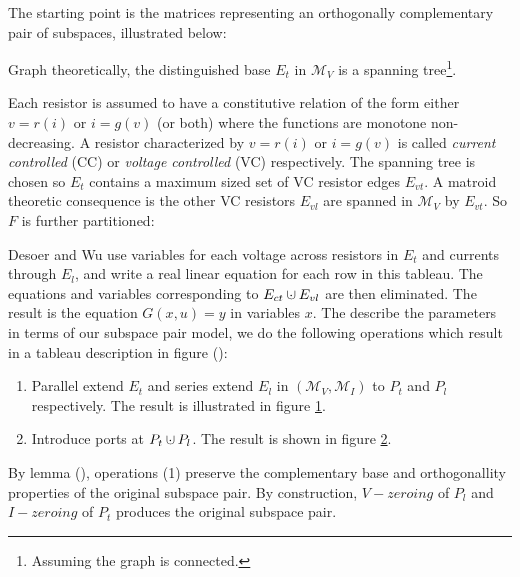 \documentclass{amsproc-sunycstr}
\theoremstyle{plain}
\theoremstyle{definition}
\theoremstyle{remark}
\newcommand{\dunion}
{\mbox{\hbox{\hskip4pt$\cdot$\hskip-4.62pt$\cup$\hskip2pt}}}
\begin{document}
The starting point is the matrices representing an orthogonally complementary
pair of subspaces, illustrated below:
\begin{center}

\end{center}
Graph theoretically, the distinguished base $E_t$ in 
$\mathcal{M}_V$ is a spanning tree\footnote{Assuming the graph is connected.}.

Each resistor is assumed to have a constitutive relation of the form either
$v=r(i)$ or $i=g(v)$ (or both) where the functions are monotone non-decreasing.
A resistor characterized by
$v=r(i)$ or $i=g(v)$ is called \textit{current controlled} (CC) or
\textit{voltage controlled} (VC) respectively.  The spanning tree is chosen so
$E_t$ contains a maximum sized set of VC resistor edges $E_{vt}$.  A matroid
theoretic consequence is the other VC resistors $E_{vl}$ are spanned in 
$\mathcal{M}_V$ by $E_{vt}$.  So $F$ is further partitioned:

Desoer and Wu use variables for each voltage across resistors in $E_t$ and
currents through $E_l$, and write a real linear equation for each row in this
tableau.   The equations and variables corresponding to $E_{ct}\dunion E_{vl}$
are then eliminated.  The result is the equation $G(x,u)=y$ in variables
$x$.  The describe the parameters in terms of our subspace pair model, we 
do the following operations which result in a tableau description in figure
():
\begin{enumerate}
\item Parallel extend $E_t$ and series extend $E_l$ in 
$(\mathcal{M}_V,\mathcal{M}_I)$ to $P_t$ and $P_l$ respectively.  The result is 
illustrated in figure \ref{DEdualmatrices2}.
\item Introduce ports at $P_t\dunion P_l$.  The result is shown in figure 
\ref{DEsubspacepair}.
\end{enumerate}

\begin{figure}
\label{DEdualmatrices2}

\end{figure}

\begin{figure}
\label{DEsubspacepair}

\end{figure}


By lemma (), operations (1) preserve the complementary base and 
orthogonallity properties of the original subspace pair.  By construction,
$V-zeroing$ of $P_l$ and $I-zeroing$ of $P_t$ produces the original subspace
pair.
\end{document}
